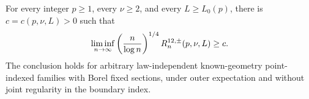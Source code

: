 For every integer \(p\geq1\), every \(\nu\geq2\), and every \(L\geq L_0(p)\), there is \(c=c(p,\nu,L)>0\) such that
\[
 \liminf_{n\to\infty}\left({n\over\log n}\right)^{1/4}R^{12,\pm}_n(p,\nu,L)\geq c.
\]
The conclusion holds for arbitrary law-independent known-geometry point-indexed families with Borel fixed sections, under outer expectation and without joint regularity in the boundary index.